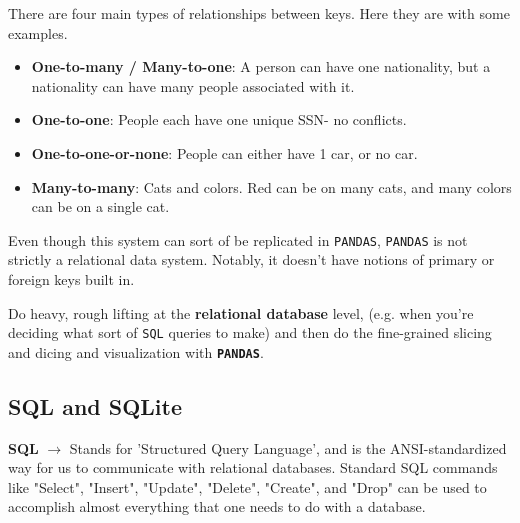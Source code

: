 \documentclass[english, 10pt]{article}
\begin{document}
{



}

There are four main types of relationships between keys. Here they are with some examples.

\begin{itemize}
	\item \textbf{One-to-many / Many-to-one}: A person can have one nationality, but a nationality can have many people associated with it.
	\item \textbf{One-to-one}: People each have one unique SSN- no conflicts.
	\item \textbf{One-to-one-or-none}: People can either have 1 car, or no car.
	\item \textbf{Many-to-many}: Cats and colors. Red can be on many cats, and many colors can be on a single cat.
\end{itemize}

Even though this system can sort of be replicated in \texttt{PANDAS}, \texttt{PANDAS} is not strictly a relational data system. Notably, it doesn't have notions of primary or foreign keys built in.

\begin{myproof}
Do heavy, rough lifting at the \textbf{relational database} level, (e.g. when you're deciding what sort of \texttt{SQL} queries to make) and then do the fine-grained slicing and dicing and visualization with \texttt{\textbf{PANDAS}}.
\end{myproof}

\subsection{SQL and SQLite}

\begin{tcolorbox}[title=Definition:,colframe=red!75!black,colback=red!5!white,arc=0pt,fonttitle=\bfseries]
\textbf{SQL} $\rightarrow$ Stands for 'Structured Query Language', and is the ANSI-standardized way for us to communicate with relational databases. Standard SQL commands like "Select", "Insert", "Update", "Delete", "Create", and "Drop" can be used to accomplish almost everything that one needs to do with a database.
\end{tcolorbox}
\end{document}
